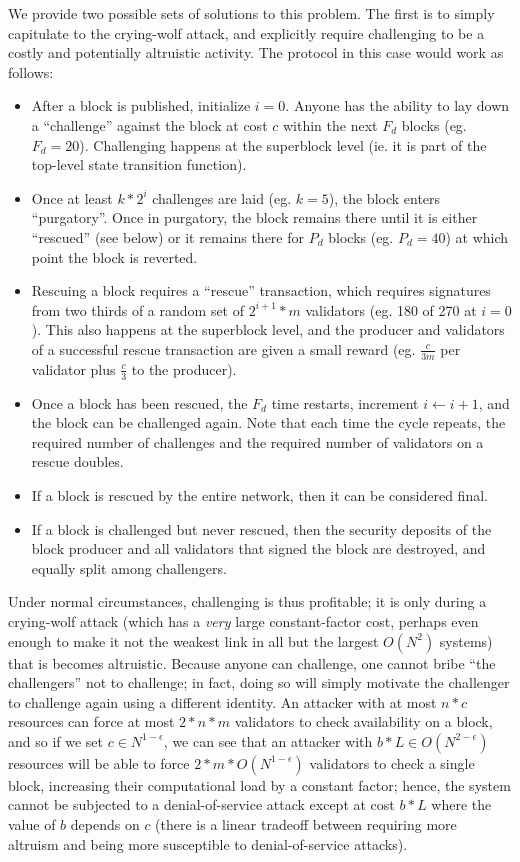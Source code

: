 \documentclass[11pt,a4paper]{report}
\theoremstyle{plain}
\theoremstyle{definition}
\theoremstyle{remark}
\begin{document}
We provide two possible sets of solutions to this problem. The first is to simply capitulate to the crying-wolf attack, and explicitly require challenging to be a costly and potentially altruistic activity. The protocol in this case would work as follows:

\begin{itemize}
\item
After a block is published, initialize $i = 0$. Anyone has the ability to lay down a ``challenge'' against the block at cost $c$ within the next $F_d$ blocks (eg. $F_d = 20$). Challenging happens at the superblock level (ie. it is part of the top-level state transition function).
\item
Once at least $k * 2^i$ challenges are laid (eg. $k = 5$), the block enters ``purgatory''. Once in purgatory, the block remains there until it is either ``rescued'' (see below) or it remains there for $P_d$ blocks (eg. $P_d = 40$) at which point the block is reverted.
\item
Rescuing a block requires a ``rescue'' transaction, which requires signatures from two thirds of a random set of $2^{i+1} * m$ validators (eg. 180 of 270 at $i = 0$). This also happens at the superblock level, and the producer and validators of a successful rescue transaction are given a small reward (eg. $\frac{c}{3m}$ per validator plus $\frac{c}{3}$ to the producer).
\item
Once a block has been rescued, the $F_d$ time restarts, increment $i \leftarrow i + 1$, and the block can be challenged again. Note that each time the cycle repeats, the required number of challenges and the required number of validators on a rescue doubles.
\item
If a block is rescued by the entire network, then it can be considered final.
\item
If a block is challenged but never rescued, then the security deposits of the block producer and all validators that signed the block are destroyed, and equally split among challengers.
\end{itemize}

Under normal circumstances, challenging is thus profitable; it is only during a crying-wolf attack (which has a \emph{very} large constant-factor cost, perhaps even enough to make it not the weakest link in all but the largest $O(N^2)$ systems) that is becomes altruistic. Because anyone can challenge, one cannot bribe ``the challengers'' not to challenge; in fact, doing so will simply motivate the challenger to challenge again using a different identity. An attacker with at most $n * c$ resources can force at most $2 * n * m$ validators to check availability on a block, and so if we set $c \in N^{1-\epsilon}$, we can see that an attacker with $b * L \in O(N^{2-\epsilon})$ resources will be able to force $2 * m * O(N^{1-\epsilon})$ validators to check a single block, increasing their computational load by a constant factor; hence, the system cannot be subjected to a denial-of-service attack except at cost $b * L$ where the value of $b$ depends on $c$ (there is a linear tradeoff between requiring more altruism and being more susceptible to denial-of-service attacks).
\end{document}
